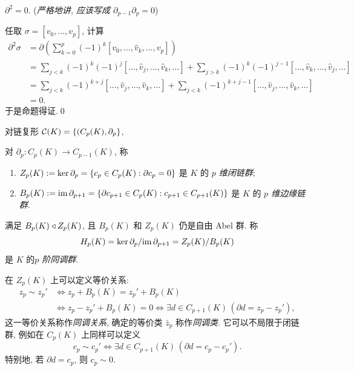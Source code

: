    \begin{Proposition}
        $ \partial^2=0 $. (\textit{严格地讲, 应该写成 $ \partial_{p-1}\partial_p=0 $})
    \end{Proposition}
    \begin{Proof}
        任取 $ \sigma=[v_0,\dots,v_p] $, 计算
        \[
            \begin{aligned}
                \partial^2\sigma&=\partial\left( \sum_{k=0}^p(-1)^k[v_0,\dots,\hat{v}_k,\dots,v_p] \right)\\
                &=\sum_{j<k}(-1)^k(-1)^j[\dots,\hat{v}_j,\dots,\hat{v}_k,\dots]+\sum_{j>k}(-1)^k(-1)^{j-1}[\dots,\hat{v}_k,\dots,\hat{v}_j,\dots]\\
                &=\sum_{j<k}(-1)^{k+j}[\dots,\hat{v}_j,\dots,\hat{v}_k,\dots]+\sum_{j<k}(-1)^{k+j-1}[\dots,\hat{v}_j,\dots,\hat{v}_k,\dots]\\
                &=0.
            \end{aligned}
        \]
        于是命题得证.\qed
    \end{Proof}

	\begin{Definition}[同调群]
        对链复形 $ \mathcal{C}(K)=\left\{ (C_p(K),\partial_p \right\} $,
        \begin{center}
        \end{center}
        对 $ \partial_p : C_p(K)\to C_{p-1}(K) $, 称
        \begin{enumerate}[(1)]
            \item $ Z_p(K):=\ker\partial_p=\left\{ c_p\in C_p(K) : \partial c_p=0 \right\} $ 是 $ K $ 的 \emph{$ p $ 维闭链群};
            \item $ B_p(K):=\mathrm{im}\,\partial_{p+1}=\left\{ \partial c_{p+1}\in C_p(K) : c_{p+1}\in C_{p+1}(K) \right\} $ 是 $ K $ 的 \emph{$ p $ 维边缘链群}.
        \end{enumerate}
        满足 $ B_p(K)\triangleleft Z_p(K) $, 且 $ B_p(K) $ 和 $ Z_p(K) $ 仍是自由 Abel 群. 称
        \[
            H_p(K)=\ker\partial_p/\mathrm{im}\,\partial_{p+1}=Z_p(K)/B_p(K)
        \]
        是 $ K $ 的\emph{$ p $ 阶同调群}.
    \end{Definition}

	在 $ Z_p(K) $ 上可以定义等价关系:
    \[
        \begin{aligned}
            z_p\sim z_p' & \Longleftrightarrow z_p+B_p(K)=z_p'+B_p(K)\\
            & \Longleftrightarrow z_p-z_p'+B_p(K)=0\Longleftrightarrow \exists d\in C_{p+1}(K)\,(\partial d=z_p-z_p'),
        \end{aligned}
    \]
    这一等价关系称作\emph{同调关系}, 确定的等价类 $ \bar{z}_p $ 称作\emph{同调类}. 它可以不局限于闭链群, 例如在 $ C_p(K) $ 上同样可以定义
    \[
        c_p\sim c_p'\Longleftrightarrow \exists d\in C_{p+1}(K)\,(\partial d=c_p-c_p').
    \]
    特别地, 若 $ \partial d=c_p $, 则 $ c_p\sim 0 $.

